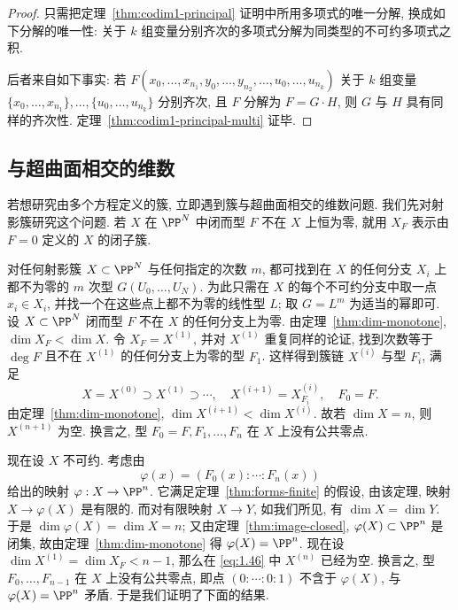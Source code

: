 \begin{proof}
	只需把定理~\ref{thm:codim1-principal} 证明中所用多项式的唯一分解, 换成如下分解的唯一性: 关于 $k$ 组变量分别齐次的多项式分解为同类型的不可约多项式之积.

	后者来自如下事实: 若 $F(x_0, \ldots, x_{n_1}, y_0, \ldots, y_{n_2}, \ldots, u_0, \ldots, u_{n_k})$ 关于 $k$ 组变量 $\{x_0, \ldots, x_{n_1}\}, \ldots, \{u_0, \ldots, u_{n_k}\}$ 分别齐次, 且 $F$ 分解为 $F = G \cdot H$, 则 $G$ 与 $H$ 具有同样的齐次性. 定理~\ref{thm:codim1-principal-multi} 证毕.
\end{proof}

\subsection{与超曲面相交的维数}

若想研究由多个方程定义的簇, 立即遇到簇与超曲面相交的维数问题. 我们先对射影簇研究这个问题. 若 $X$ 在 $\PP^N$ 中闭而型 $F$ 不在 $X$ 上恒为零, 就用 $X_F$ 表示由 $F = 0$ 定义的 $X$ 的闭子簇.

对任何射影簇 $X \subset \PP^N$ 与任何指定的次数 $m$, 都可找到在 $X$ 的任何分支 $X_i$ 上都不为零的 $m$ 次型 $G(U_0, \ldots, U_N)$. 为此只需在 $X$ 的每个不可约分支中取一点 $x_i \in X_i$, 并找一个在这些点上都不为零的线性型 $L$; 取 $G = L^m$ 为适当的幂即可. 设 $X \subset \PP^N$ 闭而型 $F$ 不在 $X$ 的任何分支上为零. 由定理~\ref{thm:dim-monotone}, $\dim X_F < \dim X$. 令 $X_F = X^{(1)}$, 并对 $X^{(1)}$ 重复同样的论证, 找到次数等于 $\deg F$ 且不在 $X^{(1)}$ 的任何分支上为零的型 $F_1$. 这样得到簇链 $X^{(i)}$ 与型 $F_i$, 满足
\begin{equation}
	\label{eq:1.46}
	X = X^{(0)} \supset X^{(1)} \supset \cdots, \quad X^{(i+1)} = X^{(i)}_{F_i}, \quad F_0 = F.
\end{equation}
由定理~\ref{thm:dim-monotone}, $\dim X^{(i+1)} < \dim X^{(i)}$. 故若 $\dim X = n$, 则 $X^{(n+1)}$ 为空. 换言之, 型 $F_0 = F, F_1, \ldots, F_n$ 在 $X$ 上没有公共零点.

现在设 $X$ 不可约. 考虑由
\begin{equation}
	\label{eq:1.47}
	\varphi(x) = (F_0(x) : \cdots : F_n(x))
\end{equation}
给出的映射 $\varphi: X \to \PP^n$. 它满足定理~\ref{thm:forms-finite} 的假设, 由该定理, 映射 $X \to \varphi(X)$ 是有限的. 而对有限映射 $X \to Y$, 如我们所见, 有 $\dim X = \dim Y$. 于是 $\dim \varphi(X) = \dim X = n$; 又由定理~\ref{thm:image-closed}, $\varphi(X) \subset \PP^n$ 是闭集, 故由定理~\ref{thm:dim-monotone} 得 $\varphi(X) = \PP^n$. 现在设 $\dim X^{(1)} = \dim X_F < n-1$, 那么在 \eqref{eq:1.46} 中 $X^{(n)}$ 已经为空. 换言之, 型 $F_0, \ldots, F_{n-1}$ 在 $X$ 上没有公共零点, 即点 $(0 : \cdots : 0 : 1)$ 不含于 $\varphi(X)$, 与 $\varphi(X) = \PP^n$ 矛盾. 于是我们证明了下面的结果.

